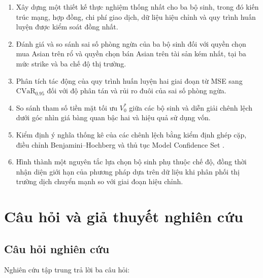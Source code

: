 \begin{enumerate}
    \item Xây dựng một thiết kế thực nghiệm thống nhất cho ba bộ sinh, trong đó
    kiến trúc mạng, hợp đồng, chi phí giao dịch, dữ liệu hiệu chỉnh và quy trình
    huấn luyện được kiểm soát đồng nhất.

    \item Đánh giá và so sánh sai số phòng ngừa của ba bộ sinh đối với quyền
    chọn mua Asian trên rổ và quyền chọn bán Asian trên tài sản kém nhất, tại
    ba mức strike và ba chế độ thị trường.

    \item Phân tích tác động của quy trình huấn luyện hai giai đoạn từ MSE sang
    $\mathrm{CVaR}_{0.95}$ đối với độ phân tán và rủi ro đuôi của sai số phòng
    ngừa.

    \item So sánh tham số tiền mặt tối ưu $V_0^{*}$ giữa các bộ sinh và diễn
    giải chênh lệch dưới góc nhìn giá bàng quan bậc hai và hiệu quả sử dụng vốn.

    \item Kiểm định ý nghĩa thống kê của các chênh lệch bằng kiểm định ghép cặp,
    điều chỉnh Benjamini--Hochberg \parencite{BenjaminiHochberg1995} và thủ tục
    Model Confidence Set \parencite{HansenLundeNason2011}.

    \item Hình thành một nguyên tắc lựa chọn bộ sinh phụ thuộc chế độ, đồng thời
    nhận diện giới hạn của phương pháp dựa trên dữ liệu khi phân phối thị trường
    dịch chuyển mạnh so với giai đoạn hiệu chỉnh.
\end{enumerate}

\section{Câu hỏi và giả thuyết nghiên cứu}
\label{sec:cau-hoi-gia-thuyet}

\subsection{Câu hỏi nghiên cứu}

Nghiên cứu tập trung trả lời ba câu hỏi:


